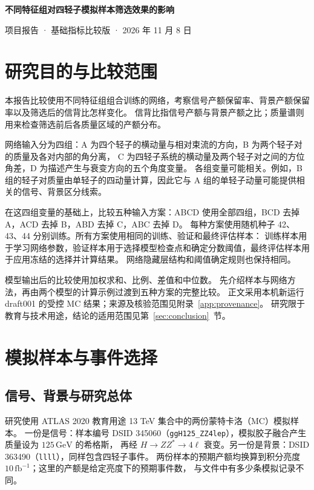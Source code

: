 \documentclass[11pt,a4paper,fontset=fandol,scheme=plain]{ctexart}
\newcommand{\gev}{\,\mathrm{GeV}}
\begin{document}
{\LARGE\bfseries\color{reportblue} 不同特征组对四轻子模拟样本筛选效果的影响\par}
\vspace{6pt}
项目报告 · 基础指标比较版 · 2026 年 11 月 8 日

\section{研究目的与比较范围}

本报告比较使用不同特征组组合训练的网络，考察信号产额保留率、背景产额保留率以及筛选后的信背比怎样变化。
信背比指信号产额与背景产额之比；质量谱则用来检查筛选前后各质量区域的产额分布。

网络输入分为四组：A 为四个轻子的横动量与相对束流的方向，B 为两个轻子对的质量及各对内部的角分离，
C 为四轻子系统的横动量及两个轻子对之间的方位角差，D 为描述产生与衰变方向的五个角度变量。
各组变量可能相关。例如，B 组的轻子对质量由单轻子的四动量计算，因此它与 A 组的单轻子动量可能提供相关的信号、背景区分线索。

在这四组变量的基础上，比较五种输入方案：ABCD 使用全部四组，BCD 去掉 A，ACD 去掉 B，ABD 去掉 C，ABC 去掉 D。
每种方案使用随机种子 42、43、44 分别训练。所有方案使用相同的训练、验证和最终评估样本：
训练样本用于学习网络参数，验证样本用于选择模型检查点和确定分数阈值，最终评估样本用于应用冻结的选择并计算结果。
网络隐藏层结构和阈值确定规则也保持相同。

模型输出后的比较使用加权求和、比例、差值和中位数。
先介绍样本与网络方法，再由两个模型的计算示例过渡到五种方案的完整比较。
正文采用本机新运行 draft001 的受控 MC 结果；来源及核验范围见附录~\ref{app:provenance}。
研究限于教育与技术用途，结论的适用范围见第~\ref{sec:conclusion}~节。

\section{模拟样本与事件选择}

\subsection{信号、背景与研究总体}
研究使用 ATLAS 2020 教育用途 13 TeV 集合中的两份蒙特卡洛（MC）模拟样本\cite{OpenData}。
一份是信号：样本编号 DSID 345060（\texttt{ggH125\_ZZ4lep}），模拟胶子融合产生质量设为 $125\gev$ 的希格斯，
再经 $H\to ZZ^*\to4\ell$ 衰变。另一份是背景：DSID 363490（\texttt{llll}），同样包含四轻子事件。
两份样本的预期产额均换算到积分亮度 $10\,\mathrm{fb}^{-1}$；这里的产额是给定亮度下的预期事件数，
与文件中有多少条模拟记录不同。
\end{document}
